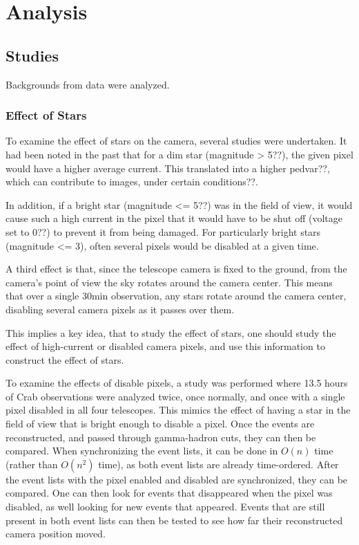 \cleartooddpage[\thispagestyle{empty}]
\chapter{Analysis}

\section{Studies}
Backgrounds from data were analyzed.

\subsection{Effect of Stars}
To examine the effect of stars on the camera, several studies were undertaken.
It had been noted in the past that for a dim star (magnitude > 5??), the given pixel would have a higher average current.
This translated into a higher pedvar??, which can contribute to images, under certain conditions??.

In addition, if a bright star (magnitude <= 5??) was in the field of view, it would cause such a high current in the pixel that it would have to be shut off (voltage set to 0??) to prevent it from being damaged.
For particularly bright stars (magnitude <= 3), often several pixels would be disabled at a given time.

A third effect is that, since the telescope camera is fixed to the ground, from the camera's point of view the sky rotates around the camera center.
This means that over a single 30min observation, any stars rotate around the camera center, disabling several camera pixels as it passes over them.

This implies a key idea, that to study the effect of stars, one should study the effect of high-current or disabled camera pixels, and use this information to construct the effect of stars.

To examine the effects of disable pixels, a study was performed where 13.5 hours of Crab observations were analyzed twice, once normally, and once with a single pixel disabled in all four telescopes.
This mimics the effect of having a star in the field of view that is bright enough to disable a pixel.
Once the events are reconstructed, and passed through gamma-hadron cuts, they can then be compared.
When synchronizing the event lists, it can be done in $O\left(n\right)$ time (rather than $O\left(n^2\right)$ time), as both event lists are already time-ordered.
After the event lists with the pixel enabled and disabled are synchronized, they can be compared.
One can then look for events that disappeared when the pixel was disabled, as well looking for new events that appeared.
Events that are still present in both event lists can then be tested to see how far their reconstructed camera position moved.

